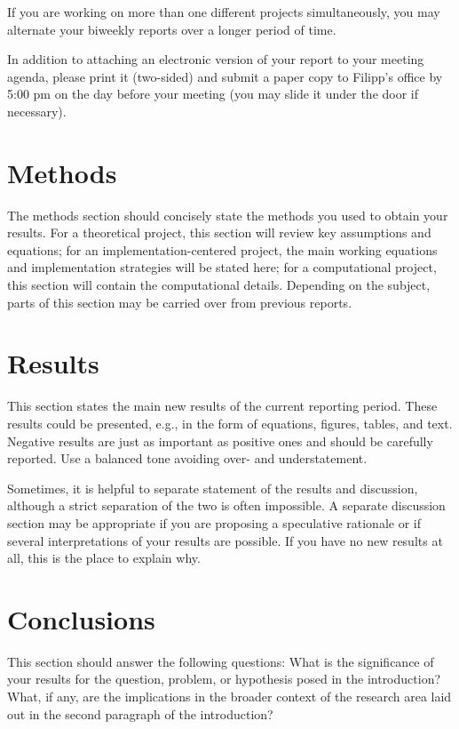 \documentclass[11pt]{article}
\begin{document}
If you are working on more than one different projects simultaneously,
you may alternate your biweekly reports over a longer period of
time.

In addition to attaching an electronic version of your report to your
meeting agenda, please print it (two-sided) and submit a paper copy to
Filipp's office by 5:00 pm on the day before your meeting (you may slide
it under the door if necessary). 

\section{Methods}

The methods section should concisely state the methods you used to
obtain your results. For a theoretical project, this section will
review key assumptions and equations; for an implementation-centered
project, the main working equations and implementation strategies will
be stated here; for a computational project, this section will contain
the computational details. Depending on the subject, parts of this
section may be carried over from previous reports.

\section{Results}

This section states the main new results of the current
reporting period. These results could be presented, e.g., in the form of
equations, figures, tables, and text. Negative results are just as
important as positive ones and should be carefully reported. Use a
balanced tone avoiding over- and understatement. 

Sometimes, it is helpful to separate statement of the results and
discussion, although a strict separation of the two is often
impossible. A separate discussion section may be appropriate if you are
proposing a speculative rationale or if several interpretations of your
results are possible. If you have no new results at all, this is the
place to explain why. 

\section{Conclusions}


This section should answer the following questions:
What is the significance of your results for the question, problem, or
hypothesis posed in the introduction? What, if any, are the
implications in the broader context of the research area laid out in the
second paragraph of the introduction? 
\end{document}
